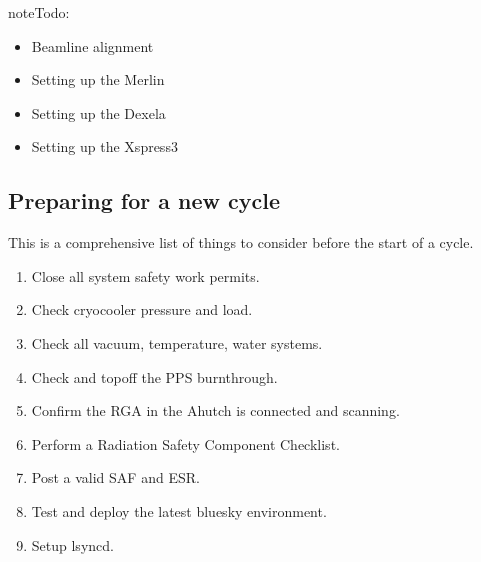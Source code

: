 \documentclass[letterpaper,10pt,english]{sphinxmanual}
\begin{document}
\begin{sphinxadmonition}{note}{\label{\detokenize{staff:id2}}Todo:}\begin{itemize}
\item {} 
\sphinxAtStartPar
Beamline alignment

\item {} 
\sphinxAtStartPar
Setting up the Merlin

\item {} 
\sphinxAtStartPar
Setting up the Dexela

\item {} 
\sphinxAtStartPar
Setting up the Xspress3

\end{itemize}
\end{sphinxadmonition}


\subsection{Preparing for a new cycle}
\label{\detokenize{staff:preparing-for-a-new-cycle}}
\sphinxAtStartPar
This is a comprehensive list of things to consider before the start of a cycle.
\begin{enumerate}
%
\item {} 
\sphinxAtStartPar
Close all system safety work permits.

\item {} 
\sphinxAtStartPar
Check cryocooler pressure and load.

\item {} 
\sphinxAtStartPar
Check all vacuum, temperature, water systems.

\item {} 
\sphinxAtStartPar
Check and top\sphinxhyphen{}off the PPS burn\sphinxhyphen{}through.

\item {} 
\sphinxAtStartPar
Confirm the RGA in the A\sphinxhyphen{}hutch is connected and scanning.

\item {} 
\sphinxAtStartPar
Perform a Radiation Safety Component Checklist.

\item {} 
\sphinxAtStartPar
Post a valid SAF and ESR.

\item {} 
\sphinxAtStartPar
Test and deploy the latest bluesky environment.

\item {} 
\sphinxAtStartPar
Setup lsyncd.

\end{enumerate}
\end{document}
